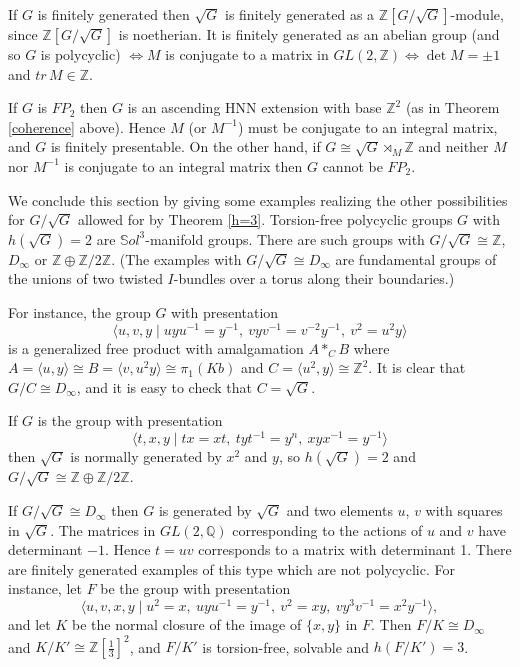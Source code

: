 \documentclass[12pt]{amsart}
\begin{document}
If  $G$ is finitely generated then $\sqrt{G}$ is finitely generated 
as a $\mathbb{Z}[G/\sqrt{G}]$-module, 
since $\mathbb{Z}[G/\sqrt{G}]$ is noetherian.
It is finitely generated as an abelian group (and so $G$ is polycyclic) 
$\Leftrightarrow{M}$ is conjugate to a matrix in $GL(2,\mathbb{Z})
\Leftrightarrow\det{M}=\pm1$ and $tr\,M\in\mathbb{Z}$.

If $G$ is $FP_2$ then $G$ is an ascending HNN extension with base 
$\mathbb{Z}^2$ (as in Theorem \ref{coherence} above).
Hence $M$ (or $M^{-1}$) must be conjugate to an integral matrix,
and $G$ is finitely presentable.
On the other hand, 
if $G\cong\sqrt{G}\rtimes_M\mathbb{Z}$ and neither $M$ nor $M^{-1}$
is conjugate to an integral matrix then $G$ cannot be $FP_2$.

We conclude this section by giving some examples realizing 
the other possibilities for $G/\sqrt{G}$ allowed for by Theorem \ref{h=3}.
Torsion-free polycyclic groups $G$ with $h(\sqrt{G})=2$ 
are $\mathbb{S}ol^3$-manifold groups.
There are such groups with
$G/\sqrt{G}\cong\mathbb{Z}$, $D_\infty$ or 
$\mathbb{Z}\oplus\mathbb{Z}/2\mathbb{Z}$.
(The examples with $G/\sqrt{G}\cong{D_\infty}$ are fundamental groups 
of the unions of two twisted $I$-bundles over a torus along their boundaries.)

For instance, the group $G$ with presentation
\[
\langle{u,v,y}\mid{uyu^{-1}=y^{-1}},~vyv^{-1}=v^{-2}y^{-1},~v^2=u^2y\rangle
\]
is a generalized free product with amalgamation $A*_CB$ where 
$A=\langle{u,y}\rangle\cong{B}=\langle{v,u^2y}\rangle\cong\pi_1(Kb)$
and $C=\langle{u^2,y}\rangle\cong\mathbb{Z}^2$.
It is clear that $G/C\cong{D_\infty}$, and it is easy to check that $C=\sqrt{G}$.

If $G$ is the group with presentation
\[
\langle{t,x,y}\mid{tx=xt},~tyt^{-1}=y^n,~xyx^{-1}=y^{-1}\rangle
\]
then $\sqrt{G}$ is normally generated by $x^2$ and $y$, so 
$h(\sqrt{G})=2$ and 
$G/\sqrt{G}\cong
\mathbb{Z}\oplus\mathbb{Z}/2\mathbb{Z}$.

If $G/\sqrt{G}\cong{D_\infty}$ then $G$ is generated by $\sqrt{G}$ 
and two elements $u$, $v$ with squares in $\sqrt{G}$. 
The matrices in $GL(2,\mathbb{Q})$ corresponding to the actions 
of $u$ and $v$ have determinant $-1$.
Hence $t=uv$ corresponds to a matrix with determinant 1.
There are finitely generated examples of this type which are not polycyclic.
For instance,
let $F$ be the group with presentation
\[
\langle{u,v,x,y}\mid{u^2=x},~uyu^{-1}=y^{-1},~v^2=xy,~vy^3v^{-1}=x^2y^{-1}
\rangle,
\]
and let $K$ be the normal closure of  the image of $\{x,y\}$ in $F$.
Then $F/K\cong{D_\infty}$ and $K/K'\cong\mathbb{Z}[\frac13]^2$,
and $F/K'$ is torsion-free, solvable and $h(F/K')=3$.
\end{document}
